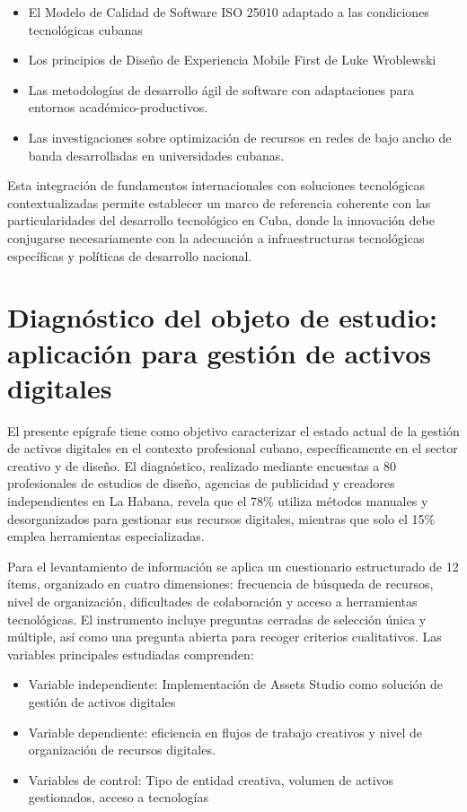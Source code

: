 \begin{itemize}
    \item El Modelo de Calidad de Software ISO 25010 adaptado a las condiciones tecnológicas cubanas
    \item Los principios de Diseño de Experiencia Mobile First de Luke Wroblewski
    \item Las metodologías de desarrollo ágil de software con adaptaciones para entornos académico-productivos.
    \item Las investigaciones sobre optimización de recursos en redes de bajo ancho de banda desarrolladas en universidades cubanas.
\end{itemize}

Esta integración de fundamentos internacionales con soluciones tecnológicas contextualizadas permite establecer un marco de referencia coherente con las particularidades del desarrollo tecnológico en Cuba, donde la innovación debe conjugarse necesariamente con la adecuación a infraestructuras tecnológicas específicas y políticas de desarrollo nacional.

\section{Diagnóstico del objeto de estudio: aplicación para gestión de activos digitales}

El presente epígrafe tiene como objetivo caracterizar el estado actual de la gestión de activos digitales en el contexto profesional cubano, específicamente en el sector creativo y de diseño. El diagnóstico, realizado mediante encuestas a 80 profesionales de estudios de diseño, agencias de publicidad y creadores independientes en La Habana, revela que el 78\% utiliza métodos manuales y desorganizados para gestionar sus recursos digitales, mientras que solo el 15\% emplea herramientas especializadas.

Para el levantamiento de información se aplica un cuestionario estructurado de 12 ítems, organizado en cuatro dimensiones: frecuencia de búsqueda de recursos, nivel de organización, dificultades de colaboración y acceso a herramientas tecnológicas. El instrumento incluye preguntas cerradas de selección única y múltiple, así como una pregunta abierta para recoger criterios cualitativos.
Las variables principales estudiadas comprenden:

\begin{itemize}
    \item Variable independiente: Implementación de Assets Studio como solución de gestión de activos digitales
    \item Variable dependiente: eficiencia en flujos de trabajo creativos y nivel de organización de recursos digitales.
    \item Variables de control: Tipo de entidad creativa, volumen de activos gestionados, acceso a tecnologías
   
\end{itemize}

